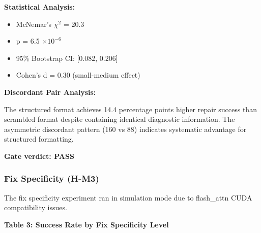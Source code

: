\textbf{Statistical Analysis:}
\begin{itemize}
\item McNemar's $\chi^2$ = 20.3
\item p = 6.5 $\times 10^{-6}$
\item 95\% Bootstrap CI: [0.082, 0.206]
\item Cohen's d = 0.30 (small-medium effect)
\end{itemize}

\textbf{Discordant Pair Analysis:}

\begin{table}[htbp]
\centering
{}
\end{table}

The structured format achieves 14.4 percentage points higher repair success than scrambled format despite containing identical diagnostic information. The asymmetric discordant pattern (160 vs 88) indicates systematic advantage for structured formatting.

\textbf{Gate verdict: PASS}

\subsubsection{Fix Specificity (H-M3)}

The fix specificity experiment ran in simulation mode due to flash\_attn CUDA compatibility issues.

\textbf{Table 3: Success Rate by Fix Specificity Level}

\begin{table}[htbp]
\centering
{}
\end{table}

